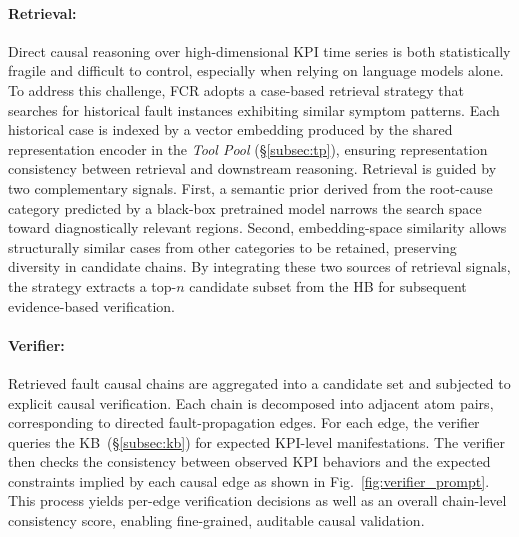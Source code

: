 \documentclass[sigconf,10pt]{acmart} %
\begin{document}
\paragraph{Retrieval:}
Direct causal reasoning over high-dimensional KPI time series is both statistically fragile and difficult to control, especially when relying on language models alone.
To address this challenge, FCR adopts a case-based retrieval strategy that searches for historical fault instances exhibiting similar symptom patterns.
Each historical case is indexed by a vector embedding produced by the shared representation encoder in the \emph{Tool Pool} (\S\ref{subsec:tp}), ensuring representation consistency between retrieval and downstream reasoning.
Retrieval is guided by two complementary signals.
First, a semantic prior derived from the root-cause category predicted by a black-box pretrained model narrows the search space toward diagnostically relevant regions.
Second, embedding-space similarity allows structurally similar cases from other categories to be retained, preserving diversity in candidate chains.
By integrating these two sources of retrieval signals, the strategy extracts a top-$n$ candidate subset from the HB for subsequent evidence-based verification.


\paragraph{Verifier:}
Retrieved fault causal chains are aggregated into a candidate set and subjected to explicit causal verification.
Each chain is decomposed into adjacent atom pairs, corresponding to directed fault-propagation edges.
For each edge, the verifier queries the KB~(\S\ref{subsec:kb}) for expected KPI-level manifestations.
The verifier then checks the consistency between observed KPI behaviors and the expected constraints implied by each causal edge as shown in Fig.~\ref{fig:verifier_prompt}.
This process yields per-edge verification decisions as well as an overall chain-level consistency score, enabling fine-grained, auditable causal validation.
\end{document}
